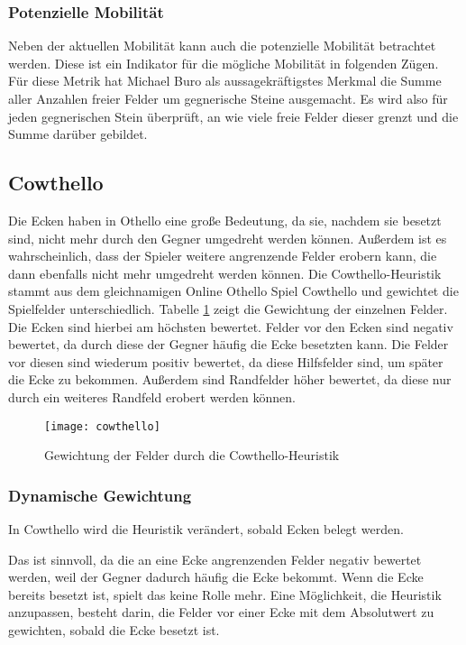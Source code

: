 \subsubsection{Potenzielle Mobilität}
\label{sec:potmobility}
Neben der aktuellen Mobilität kann auch die potenzielle Mobilität betrachtet werden. Diese ist ein Indikator für die
mögliche Mobilität in folgenden Zügen. Für diese Metrik hat Michael Buro als aussagekräftigstes Merkmal die Summe aller Anzahlen freier
Felder um gegnerische Steine ausgemacht. Es wird also für jeden gegnerischen Stein überprüft, an wie viele freie Felder
dieser grenzt und die Summe darüber gebildet.
\cite[S.~8f.]{evaluationfunctions}

\subsection{Cowthello}
\label{sec:cowthello}
Die Ecken haben in Othello eine große Bedeutung, da sie, nachdem sie besetzt sind, nicht mehr durch den Gegner umgedreht werden können. Außerdem
ist es wahrscheinlich, dass der Spieler weitere angrenzende Felder erobern kann, die dann ebenfalls nicht mehr umgedreht
werden können. Die Cowthello-Heuristik stammt aus dem gleichnamigen Online Othello Spiel Cowthello und gewichtet die Spielfelder
unterschiedlich.
\cite{cowthello}
Tabelle \ref{fig:cowthello} zeigt die Gewichtung der einzelnen Felder. Die Ecken sind hierbei am höchsten bewertet. Felder vor
den Ecken sind negativ bewertet, da durch diese der Gegner häufig die Ecke besetzten kann. Die Felder vor diesen sind wiederum
positiv bewertet, da diese Hilfsfelder sind, um später die Ecke zu bekommen. Außerdem sind Randfelder höher bewertet, da
diese nur durch ein weiteres Randfeld erobert werden können.

\begin{figure}[H]
    \centering
    \texttt{[image: cowthello]}
    \caption{Gewichtung der Felder durch die Cowthello-Heuristik}
    \label{fig:cowthello}
\end{figure}

\subsubsection{Dynamische Gewichtung}
In Cowthello wird die Heuristik verändert, sobald Ecken belegt werden.
\cite{cowthello}

Das ist sinnvoll, da die an eine Ecke angrenzenden Felder negativ bewertet werden, weil der Gegner dadurch häufig die
Ecke bekommt. Wenn die Ecke bereits besetzt ist, spielt das keine Rolle mehr. Eine Möglichkeit, die Heuristik anzupassen, besteht darin, die Felder vor einer Ecke mit dem Absolutwert zu gewichten, sobald die Ecke besetzt ist.
